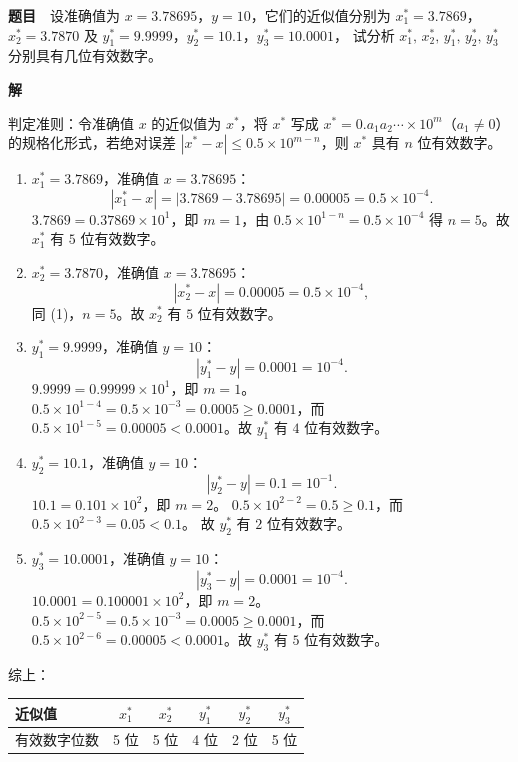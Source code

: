 \documentclass[a4paper,11pt]{ctexart}
\begin{document}
\textbf{题目}　设准确值为 $x=3.78695$，$y=10$，它们的近似值分别为
$x_1^*=3.7869$，$x_2^*=3.7870$ 及 $y_1^*=9.9999$，$y_2^*=10.1$，$y_3^*=10.0001$，
试分析 $x_1^*,\,x_2^*,\,y_1^*,\,y_2^*,\,y_3^*$ 分别具有几位有效数字。

\textbf{解}

判定准则：令准确值 $x$ 的近似值为 $x^*$，将 $x^*$ 写成
$x^*=0.a_1a_2\cdots\times 10^{m}$（$a_1\neq 0$）的规格化形式，若绝对误差
$|x^*-x|\le 0.5\times 10^{m-n}$，则 $x^*$ 具有 $n$ 位有效数字。

\begin{enumerate}
  \item $x_1^*=3.7869$，准确值 $x=3.78695$：
  \[
    |x_1^*-x|=|3.7869-3.78695|=0.00005=0.5\times 10^{-4}.
  \]
  $3.7869=0.37869\times 10^{1}$，即 $m=1$，由 $0.5\times 10^{1-n}=0.5\times 10^{-4}$
  得 $n=5$。故 $x_1^*$ 有 $5$ 位有效数字。

  \item $x_2^*=3.7870$，准确值 $x=3.78695$：
  \[
    |x_2^*-x|=0.00005=0.5\times 10^{-4},
  \]
  同 (1)，$n=5$。故 $x_2^*$ 有 $5$ 位有效数字。

  \item $y_1^*=9.9999$，准确值 $y=10$：
  \[
    |y_1^*-y|=0.0001=10^{-4}.
  \]
  $9.9999=0.99999\times 10^{1}$，即 $m=1$。
  $0.5\times 10^{1-4}=0.5\times 10^{-3}=0.0005\ge 0.0001$，而
  $0.5\times 10^{1-5}=0.00005<0.0001$。故 $y_1^*$ 有 $4$ 位有效数字。

  \item $y_2^*=10.1$，准确值 $y=10$：
  \[
    |y_2^*-y|=0.1=10^{-1}.
  \]
  $10.1=0.101\times 10^{2}$，即 $m=2$。
  $0.5\times 10^{2-2}=0.5\ge 0.1$，而 $0.5\times 10^{2-3}=0.05<0.1$。
  故 $y_2^*$ 有 $2$ 位有效数字。

  \item $y_3^*=10.0001$，准确值 $y=10$：
  \[
    |y_3^*-y|=0.0001=10^{-4}.
  \]
  $10.0001=0.100001\times 10^{2}$，即 $m=2$。
  $0.5\times 10^{2-5}=0.5\times 10^{-3}=0.0005\ge 0.0001$，而
  $0.5\times 10^{2-6}=0.00005<0.0001$。故 $y_3^*$ 有 $5$ 位有效数字。
\end{enumerate}

综上：
\begin{center}
  \begin{tabular}{lccccc}
    \toprule
    近似值 & $x_1^*$ & $x_2^*$ & $y_1^*$ & $y_2^*$ & $y_3^*$ \\
    \midrule
    有效数字位数 & 5 位 & 5 位 & 4 位 & 2 位 & 5 位 \\
    \bottomrule
  \end{tabular}
\end{center}
\end{document}

